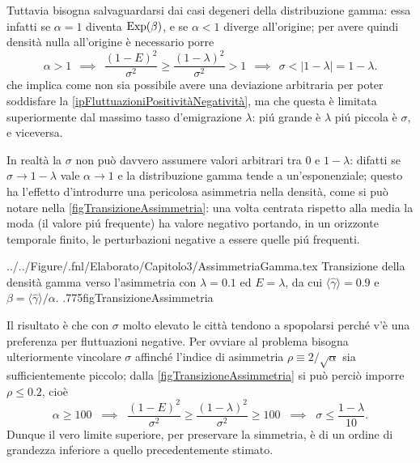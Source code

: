         Tuttavia bisogna salvaguardarsi dai casi degeneri della distribuzione gamma: essa infatti se \(\alpha=1\) diventa \(\operatorname{Exp}(\beta)\), e se \(\alpha<1\) diverge all'origine; per avere quindi densità nulla all'origine è necessario porre
        \begin{equation*}
          \label{eqVincoloTraParametri}
          \alpha>1
          \ \ \implies\ \ 
          \frac{(1-E)^2}{\sigma^2}\geq
          \frac{(1-\lambda)^2}{\sigma^2}>1
          \ \ \implies\ \ 
          \sigma<\vert1-\lambda\vert=1-\lambda.
        \end{equation*}
        che implica come non sia possibile avere una deviazione arbitraria per poter soddisfare la \ref{ipFluttuazioniPositivitàNegatività}, ma che questa è limitata superiormente dal massimo tasso d'emigrazione \(\lambda\): piú grande è \(\lambda\) piú piccola è \(\sigma\), e viceversa.

        In realtà la \(\sigma\) non può davvero assumere valori arbitrari tra \(0\) e \(1-\lambda\): difatti se \(\sigma\to1-\lambda\) vale \(\alpha\to1\) e la distribuzione gamma tende a un'esponenziale; questo ha l'effetto d'introdurre una pericolosa asimmetria nella densità, come si può notare nella \cref{figTransizioneAssimmetria}: una volta centrata rispetto alla media la moda (il valore piú frequente) ha valore negativo portando, in un orizzonte temporale finito, le perturbazioni negative a essere quelle piú frequenti.

          {../../Figure/.fnl/Elaborato/Capitolo3/AssimmetriaGamma.tex}
          {Transizione della densità gamma verso l'asimmetria con \(\lambda=0.1\) ed \(E=\lambda\), da cui \(\langle\hat\gamma\rangle=0.9\) e \(\beta=\langle\hat\gamma\rangle/\alpha\).}
          {.775\linewidth}{figTransizioneAssimmetria}

        Il risultato è che con \(\sigma\) molto elevato le città tendono a spopolarsi perché v'è una preferenza per fluttuazioni negative. Per ovviare al problema bisogna ulteriormente vincolare \(\sigma\) affinché l'indice di asimmetria \(\rho\equiv2/\sqrt{\alpha}\) sia sufficientemente piccolo; dalla \cref{figTransizioneAssimmetria} si può perciò imporre \(\rho\leq0.2\), cioè
        \begin{equation}
          \label{eqVincoloSimmetricoTraParametri}
          \alpha\geq100
          \;\;\implies\;\;
          \frac{(1-E)^2}{\sigma^2}\geq
          \frac{(1-\lambda)^2}{\sigma^2}\geq100
          \;\;\implies\;\;
          \sigma\leq\frac{1-\lambda}{10}.
        \end{equation}
        Dunque il vero limite superiore, per preservare la simmetria, è di un ordine di grandezza inferiore a quello precedentemente stimato.
        
